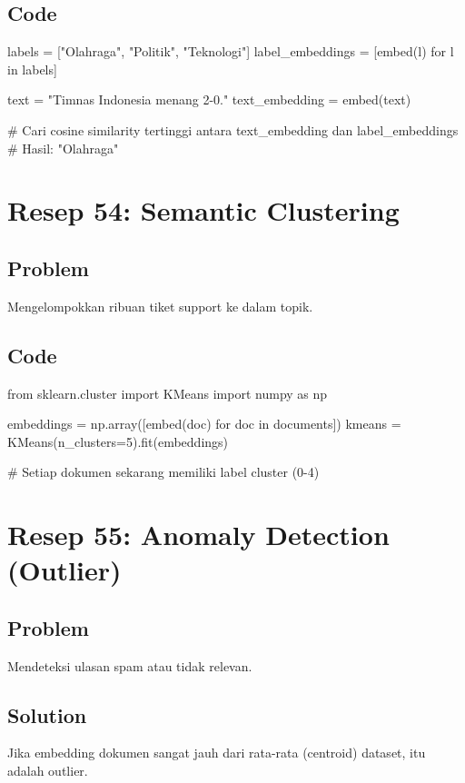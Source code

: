 \subsection*{Code}
\begin{codeblock}[language=Python]
labels = ["Olahraga", "Politik", "Teknologi"]
label_embeddings = [embed(l) for l in labels]

text = "Timnas Indonesia menang 2-0."
text_embedding = embed(text)

# Cari cosine similarity tertinggi antara text_embedding dan label_embeddings
# Hasil: "Olahraga"
\end{codeblock}

\newpage

\section{Resep 54: Semantic Clustering}

\subsection*{Problem}
Mengelompokkan ribuan tiket support ke dalam topik.

\subsection*{Code}
\begin{codeblock}[language=Python]
from sklearn.cluster import KMeans
import numpy as np

embeddings = np.array([embed(doc) for doc in documents])
kmeans = KMeans(n_clusters=5).fit(embeddings)

# Setiap dokumen sekarang memiliki label cluster (0-4)
\end{codeblock}

\newpage

\section{Resep 55: Anomaly Detection (Outlier)}

\subsection*{Problem}
Mendeteksi ulasan spam atau tidak relevan.

\subsection*{Solution}
Jika embedding dokumen sangat jauh dari rata-rata (centroid) dataset, itu adalah outlier.

